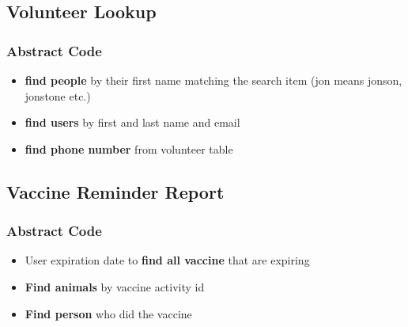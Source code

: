 \documentclass[a4paper]{article}
\begin{document}
\hypertarget{volunteer_lookup}{\subsection{Volunteer Lookup}}

\subsubsection*{Abstract Code}

\begin{itemize}
	\item \textbf{find people} by their first name matching the search item (jon means jonson, jonstone etc.)
	\item \textbf{find users} by first and last name and email
    \item \textbf{find phone number} from volunteer table

\end{itemize}




\hypertarget{vaccine_reminder_report}{\subsection{Vaccine Reminder Report }}

\subsubsection*{Abstract Code}

\begin{itemize}
	\item User expiration date to \textbf{find all vaccine} that are expiring
    \item \textbf{Find animals} by vaccine activity id
    \item \textbf{Find person} who did the vaccine



\end{itemize}
\end{document}
